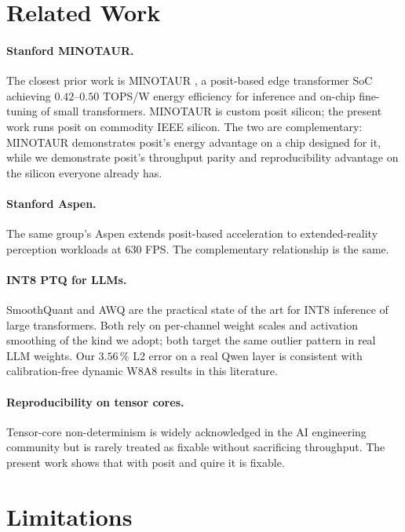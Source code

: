 \documentclass[11pt,a4paper]{article}
\newcommand{\TOPS}{\textsf{TOPS}}
\begin{document}
\section{Related Work}
\label{sec:related}

\paragraph{Stanford MINOTAUR.} The closest prior work is MINOTAUR
\cite{minotaur2025}, a posit-based edge transformer SoC achieving
$0.42\text{--}0.50$ \TOPS{}/W energy efficiency for inference and
on-chip fine-tuning of small transformers. MINOTAUR is custom posit
silicon; the present work runs posit on commodity IEEE silicon. The
two are complementary: MINOTAUR demonstrates posit's energy advantage
on a chip designed for it, while we demonstrate posit's throughput
parity and reproducibility advantage on the silicon everyone already
has.

\paragraph{Stanford Aspen.} The same group's Aspen
\cite{aspen2025} extends posit-based acceleration to extended-reality
perception workloads at $630$ FPS. The complementary relationship is
the same.

\paragraph{INT8 PTQ for LLMs.} SmoothQuant \cite{smoothquant} and AWQ
\cite{awq} are the practical state of the art for INT8 inference of
large transformers. Both rely on per-channel weight scales and
activation smoothing of the kind we adopt; both target the same
outlier pattern in real LLM weights. Our $3.56\,\%$ L2 error on a real
Qwen layer is consistent with calibration-free dynamic W8A8 results
in this literature.

\paragraph{Reproducibility on tensor cores.} Tensor-core
non-determinism is widely acknowledged in the AI engineering community
\cite{nvidia_determinism_docs} but is rarely treated as fixable
without sacrificing throughput. The present work shows that with
posit and quire it is fixable.

\section{Limitations}
\label{sec:limits}
\end{document}
